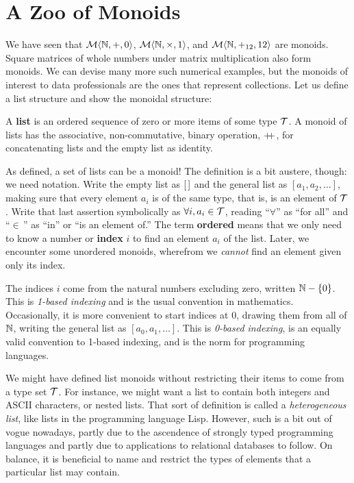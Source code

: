 \section{\color{Red}A Zoo of Monoids}


We have seen that $\mathcal{M}\langle{\mathbb{N}},{+},{0}\rangle$, $\mathcal{M}\langle{\mathbb{N}},{\times},{1}\rangle$, and $\mathcal{M}\langle{\mathbb{N}},{+_{12}},{12}\rangle$ are monoids. Square matrices of whole numbers under matrix multiplication also form monoids. We can devise many more such numerical examples, but the monoids of interest to data professionals are the ones that represent collections. Let us define a list structure and show the monoidal structure:
\begin{definition}
  A \textbf{list} is an ordered sequence of zero or more items of some type $\mathcal{T}$. A monoid of lists has the associative, non-commutative, binary operation, $\pp$, for concatenating lists and the empty list as identity.
  \label{def:list}
\end{definition}


As defined, a set of lists can be a monoid! The definition is a bit austere, though: we need notation. Write the empty list as $[\,]$ and the general list as $[a_1, a_2, \ldots]$, making sure that every element $a_i$ is of the same type, that is, is an element of $\mathcal{T}$. Write that last assertion symbolically as $\forall i,a_i \in \mathcal{T}$, reading ``$\forall$'' as ``for all'' and ``$\in\,$'' as ``in'' or ``is an element of.'' The term \textbf{ordered} means that we only need to know a number or \textbf{index} $i$ to find an element $a_i$ of the list. Later, we encounter some unordered monoids, wherefrom we \emph{cannot} find an element given only its index.


The indices $i$ come from the natural numbers excluding zero, written \mbox{$\mathbb{N}-\{0\}$}. This is \emph{1-based indexing} and is the usual convention in mathematics. Occasionally, it is more convenient to start indices at 0, drawing them from all of $\mathbb{N}$, writing the general list as $[a_0, a_1, \ldots]$. This is \emph{0-based indexing}, is an equally valid convention to 1-based indexing, and is the norm for programming languages.


We might have defined list monoids without restricting their items to come from a type set $\mathcal{T}$. For instance, we might want a list to contain both integers and ASCII characters, or nested lists. That sort of definition is called a \emph{heterogeneous list}, like lists in the programming language Lisp. However, such is a bit out of vogue nowadays, partly due to the ascendence of strongly typed programming languages and partly due to applications to relational databases to follow. On balance, it is beneficial to name and restrict the types of elements that a particular list may contain.


